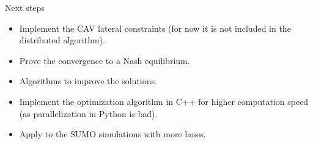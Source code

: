 \documentclass[9pt]{beamer}
\begin{document}
\begin{frame}{Next steps}

\begin{block}{}
\begin{itemize}
\item Implement the CAV lateral constraints (for now it is not included in the distributed algorithm). 

\item Prove the convergence to a Nash equilibrium.

\item Algorithms to improve the solutions.

\item Implement the optimization algorithm in C++ for higher computation speed (as parallelization in Python is bad).

\item Apply to the SUMO simulations with more lanes.
    
\end{itemize}
   
\end{block}

\end{frame}









\end{document}
